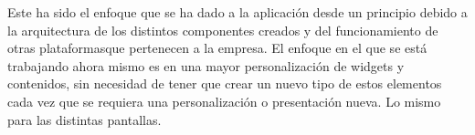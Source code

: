  Este ha sido el enfoque que se ha dado a la aplicación desde un principio debido a la arquitectura de los distintos
 componentes creados y del funcionamiento de otras plataformasque pertenecen a la empresa. El enfoque en el que se está 
 trabajando ahora mismo es en una mayor personalización de widgets y contenidos, sin necesidad de tener que crear un nuevo
 tipo de estos elementos cada vez que se requiera una personalización o presentación nueva. Lo mismo para las distintas
 pantallas. 

